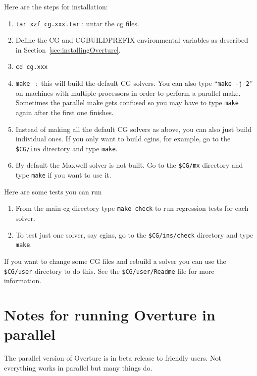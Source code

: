 \documentclass{article}
\begin{document}
\noindent Here are the steps for installation:
\begin{enumerate}
    \item {\tt tar xzf cg.xxx.tar} : untar the cg files. 
    \item Define the CG and CGBUILDPREFIX environmental variables as described in Section~\ref{sec:installingOverture}.
    \item {\tt cd cg.xxx} 
    \item {\tt make} ~:~this will build the default CG solvers.
                 You can also type ``{\tt make -j 2}'' on machines with multiple processors
                 in order to perform a parallel make. Sometimes the parallel make gets
                 confused so you may have to type {\tt make} again after the first one finishes.
    \item Instead of making all the default CG solvers as above, you can also just build individual ones. 
       If you only want to build cgins, for example, go to the {\tt \$CG/ins} directory and type {\tt make}. 
    \item By default the Maxwell solver is not built. Go to the {\tt \$CG/mx} directory and type {\tt make} if you
          want to use it. 
\end{enumerate}

Here are some tests you can run 
\begin{enumerate}
    \item From the main cg directory type {\tt make check} 
     to run regression tests for each solver.
    \item To test just one solver, say cgins, go to the {\tt \$CG/ins/check} directory and type {\tt make}. 
\end{enumerate}

If you want to change some CG files and rebuild a solver you can use the {\tt \$CG/user} directory
to do this. See the {\tt \$CG/user/Readme} file for more information.


\clearpage
\section{Notes for running Overture in parallel}


The parallel version of Overture is in beta release to friendly users. Not everything works in
parallel but many things do.
\end{document}
